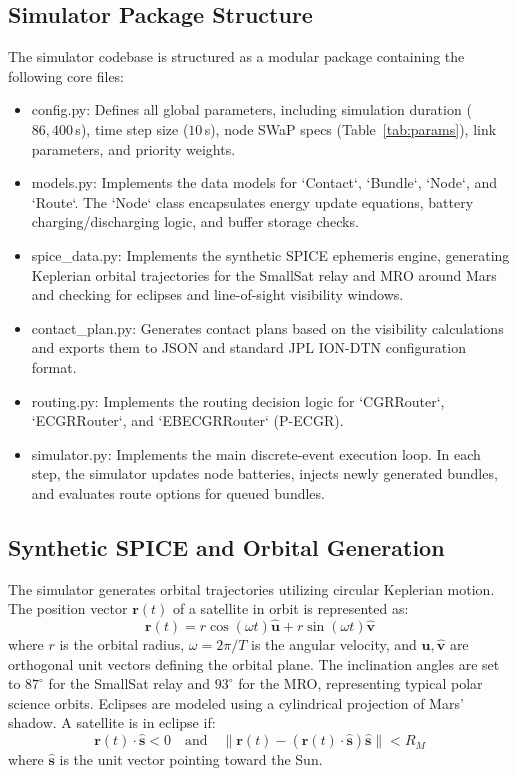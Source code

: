 \documentclass[a4paper,fleqn]{cas-dc}
\begin{document}
\subsection{Simulator Package Structure}
The simulator codebase is structured as a modular package containing the following core files:
\begin{itemize}
    \item \textsf{config.py:} Defines all global parameters, including simulation duration ($86{,}400\,$s), time step size ($10\,$s), node SWaP specs (Table~\ref{tab:params}), link parameters, and priority weights.
    \item \textsf{models.py:} Implements the data models for `Contact`, `Bundle`, `Node`, and `Route`. The `Node` class encapsulates energy update equations, battery charging/discharging logic, and buffer storage checks.
    \item \textsf{spice\_data.py:} Implements the synthetic SPICE ephemeris engine, generating Keplerian orbital trajectories for the SmallSat relay and MRO around Mars and checking for eclipses and line-of-sight visibility windows.
    \item \textsf{contact\_plan.py:} Generates contact plans based on the visibility calculations and exports them to JSON and standard JPL ION-DTN configuration format.
    \item \textsf{routing.py:} Implements the routing decision logic for `CGRRouter`, `ECGRRouter`, and `EBECGRRouter` (P-ECGR).
    \item \textsf{simulator.py:} Implements the main discrete-event execution loop. In each step, the simulator updates node batteries, injects newly generated bundles, and evaluates route options for queued bundles.
\end{itemize}

\subsection{Synthetic SPICE and Orbital Generation}
The simulator generates orbital trajectories utilizing circular Keplerian motion. The position vector $\mathbf{r}(t)$ of a satellite in orbit is represented as:
\begin{equation}
    \mathbf{r}(t) = r \cos(\omega t) \mathbf{\hat{u}} + r \sin(\omega t) \mathbf{\hat{v}}
\end{equation}
where $r$ is the orbital radius, $\omega = 2\pi / T$ is the angular velocity, and $\mathbf{\hat{u}}, \mathbf{\hat{v}}$ are orthogonal unit vectors defining the orbital plane. The inclination angles are set to $87^\circ$ for the SmallSat relay and $93^\circ$ for the MRO, representing typical polar science orbits. Eclipses are modeled using a cylindrical projection of Mars' shadow. A satellite is in eclipse if:
\begin{equation}
    \mathbf{r}(t) \cdot \mathbf{\hat{s}} < 0 \quad \text{and} \quad \|\mathbf{r}(t) - (\mathbf{r}(t) \cdot \mathbf{\hat{s}})\mathbf{\hat{s}}\| < R_M
\end{equation}
where $\mathbf{\hat{s}}$ is the unit vector pointing toward the Sun.
\end{document}
